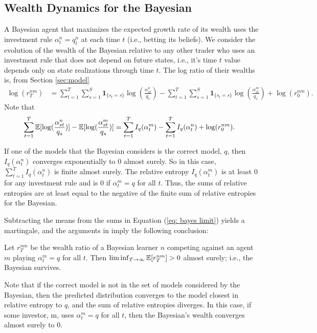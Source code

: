 \subsection{Wealth Dynamics for the Bayesian}

A Bayesian agent that maximizes the expected growth rate of its wealth uses the investment rule $\alpha^n_t=q^n_t$ at each time $t$ (i.e., betting its beliefs). We consider the evolution of the wealth of the Bayesian relative to any other trader who uses an investment rule that does not depend on future states, i.e., it's time $t$ value depends only on state realizations through time $t$.   
The log ratio of their wealths is, from Section \ref{sec:model}
  \begin{align}
	\log(r^{nm}_{T})   &= \sum_{t=1}^{T}\sum_{s=1} ^S \mathbf{1}_{\{s_t = s\}} \log (\frac{\alpha^n_{st}}{q_s}) - 
    \sum_{t=1}^{T}\sum_{s=1} ^S \mathbf{1}_{\{s_t = s\}} \log (\frac{\alpha^m_{st}}{q_s}) +
    \log(r^{nm}_{0}). 
\end{align}
Note that 
\begin{align}
\sum_{t=1}^{T} \operatorname{\mathbb{E}}[\log (\frac{\alpha^n_{st}}{q_s})]-\operatorname{\mathbb{E}}[\log(\frac{\alpha^m_{st}}{q_s})]
	   &= \sum_{t=1}^{T} I_q(\alpha^m_t)-\sum_{t=1}^{T} I_q(\alpha^n_t) + \log(r^{nm}_{0}). 
\end{align}

If one of the models that the Bayesian considers is the correct model, $q$, then $I_q(\alpha^n_t)$ converges exponentially to $0$ almost surely. So in this case,  $\sum_{t=1}^{T} I_q(\alpha^n_t)$ is finite almost surely. The relative entropy $I_q(\alpha^m_t)$ is at least $0$ for any investment rule and is $0$ if $\alpha^m_t=q$ for all $t$. Thus, the sums of relative entropies are at least equal to the negative of the finite sum of relative entropies for the Bayesian. 

Subtracting the means from the sums in Equation (\ref{eq: bayes limit}) yields a martingale, and the arguments in \cite{blumeeasley1992} imply the following conclusion:
\begin{proposition}\label{thm:Bayesians-suvive-against-q}
    Let $r^{nm}_T$ be the wealth ratio of a Bayesian learner $n$ competing against an agent $m$ playing $\alpha^m_t=q$ for all $t$. Then 
    $
    \liminf_{T \rightarrow \infty} \operatorname{\mathbb{E}}[r^{nm}_T] > 0
    $
    almost surely; i.e., the Bayesian survives.
\end{proposition}

Note that if the correct model is not in the set of models considered by the Bayesian, then the predicted distribution converges to the model closest in relative entropy to $q$, and the sum of relative entropies diverges. In this case, if some investor, m, uses  $\alpha^m_t = q$ for all $t$, then the Bayesian's wealth converges almost surely to $0$. 


